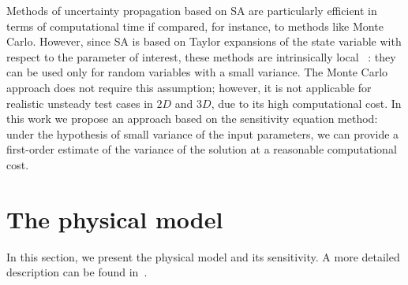 Methods of uncertainty propagation based on SA are particularly efficient in terms of computational time if compared, for instance, to methods like Monte Carlo. However, since SA is based on Taylor expansions of the state variable with respect to the parameter of interest, these methods are intrinsically local \cite{delenne2014propagation}~: they can be used only for random variables with a small variance. The Monte Carlo approach does not require this assumption; however, it is not applicable for realistic unsteady test cases in $2D$ and $3D$, due to its high computational cost. In this work we propose an approach based on the sensitivity equation method: under the hypothesis of small variance of the input parameters, we can provide a first-order estimate of the variance of the solution at a reasonable computational cost. 
\newpage
{}
\chapter{The physical model}
\label{sec_physical_model}
In this section, we present the physical model and its sensitivity. A more detailed description can be found in~\cite{FDP20}.
